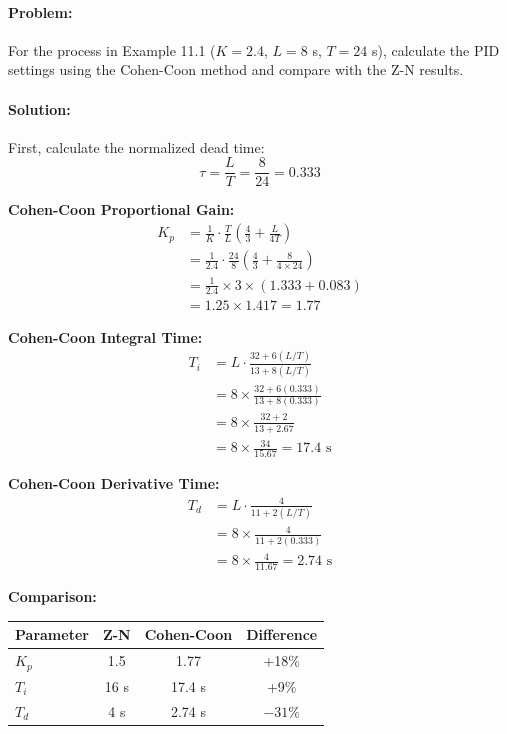 \paragraph{Problem:} For the process in Example 11.1 ($K = 2.4$, $L = 8$ s, $T = 24$ s), calculate the PID settings using the Cohen-Coon method and compare with the Z-N results.

\paragraph{Solution:}

First, calculate the normalized dead time:
\begin{equation}
    \tau = \frac{L}{T} = \frac{8}{24} = 0.333
\end{equation}

\textbf{Cohen-Coon Proportional Gain:}
\begin{align}
    K_p &= \frac{1}{K}\cdot\frac{T}{L}\left(\frac{4}{3} + \frac{L}{4T}\right) \\
    &= \frac{1}{2.4}\cdot\frac{24}{8}\left(\frac{4}{3} + \frac{8}{4 \times 24}\right) \\
    &= \frac{1}{2.4} \times 3 \times \left(1.333 + 0.083\right) \\
    &= 1.25 \times 1.417 = 1.77
\end{align}

\textbf{Cohen-Coon Integral Time:}
\begin{align}
    T_i &= L \cdot \frac{32 + 6(L/T)}{13 + 8(L/T)} \\
    &= 8 \times \frac{32 + 6(0.333)}{13 + 8(0.333)} \\
    &= 8 \times \frac{32 + 2}{13 + 2.67} \\
    &= 8 \times \frac{34}{15.67} = 17.4 \text{ s}
\end{align}

\textbf{Cohen-Coon Derivative Time:}
\begin{align}
    T_d &= L \cdot \frac{4}{11 + 2(L/T)} \\
    &= 8 \times \frac{4}{11 + 2(0.333)} \\
    &= 8 \times \frac{4}{11.67} = 2.74 \text{ s}
\end{align}

\textbf{Comparison:}
\begin{table}[htbp]
\centering
\begin{tabular}{lccc}
\toprule
\textbf{Parameter} & \textbf{Z-N} & \textbf{Cohen-Coon} & \textbf{Difference} \\
\midrule
$K_p$ & 1.5 & 1.77 & +18\% \\
$T_i$ & 16 s & 17.4 s & +9\% \\
$T_d$ & 4 s & 2.74 s & $-31\%$ \\
\bottomrule
\end{tabular}
\end{table}

